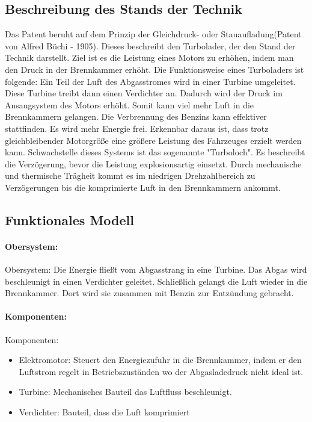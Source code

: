 \documentclass{article}
\begin{document}
\subsection{Beschreibung des Stands der Technik}
Das Patent beruht auf dem Prinzip der Gleichdruck- oder Stauaufladung(Patent von Alfred Büchi - 1905).
Dieses beschreibt den Turbolader, der den Stand der Technik darstellt.
Ziel ist es die Leistung eines Motors zu erhöhen, indem man den Druck in der Brennkammer erhöht.                                                                                        
Die Funktionsweise eines Turboladers ist folgende:
Ein Teil der Luft des Abgasstromes wird in einer Turbine umgeleitet. Diese Turbine treibt dann einen Verdichter an. Dadurch wird der Druck im Ansaugsystem des Motors erhöht. Somit kann viel mehr Luft in die Brennkammern gelangen. 
Die Verbrennung des Benzins kann effektiver stattfinden. Es wird mehr Energie frei.
Erkennbar daraus ist, dass trotz gleichbleibender Motorgröße eine größere Leistung des Fahrzeuges erzielt werden kann.                                       
Schwachstelle dieses Systems ist das sogenannte "Turboloch". Es beschreibt die Verzögerung, bevor die Leistung explosionsartig einsetzt. Durch mechanische und thermische Trägheit kommt es im niedrigen Drehzahlbereich zu Verzögerungen bis die komprimierte Luft in den Brennkammern ankommt.
\subsection{Funktionales Modell}
\paragraph{Obersystem:}
Obersystem: Die Energie fließt vom Abgasstrang in eine Turbine. Das Abgas wird beschleunigt in einen Verdichter geleitet. Schließlich gelangt die Luft wieder in die Brennkammer. Dort wird sie zusammen mit Benzin zur Entzündung gebracht.

\paragraph{Komponenten:}
Komponenten:
\begin{itemize}
\item Elektromotor: Steuert den Energiezufuhr in die Brennkammer, indem er den Luftstrom regelt in Betriebszuständen wo der Abgasladedruck nicht ideal ist.
\item Turbine: Mechanisches Bauteil das Luftfluss beschleunigt.
\item Verdichter: Bauteil, dass die Luft komprimiert 
\end{itemize}
  
\end{document}
